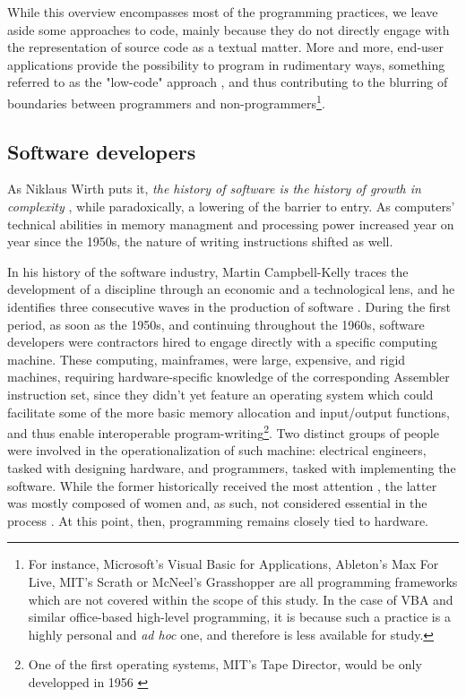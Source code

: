 While this overview encompasses most of the programming practices, we leave aside some approaches to code, mainly because they do not directly engage with the representation of source code as a textual matter. More and more, end-user applications provide the possibility to program in rudimentary ways, something referred to as the "low-code" approach \citep{team_lowcode_2021}, and thus contributing to the blurring of boundaries between programmers and non-programmers\footnote{For instance, Microsoft's Visual Basic for Applications, Ableton's Max For Live, MIT's Scrath or McNeel's Grasshopper are all programming frameworks which are not covered within the scope of this study. In the case of VBA and similar office-based high-level programming, it is because such a practice is a highly personal and \emph{ad hoc} one, and therefore is less available for study.}.

\subsection{Software developers}
\label{subsec:software-developers}

As Niklaus Wirth puts it, \emph{the history of software is the history of growth in complexity} \citep{wirth_brief_2008}, while paradoxically, a lowering of the barrier to entry. As computers' technical abilities in memory managment and processing power increased year on year since the 1950s, the nature of writing instructions shifted as well.

In his history of the software industry, Martin Campbell-Kelly traces the development of a discipline through an economic and a technological lens, and he identifies three consecutive waves in the production of software \citep{campbell-kelly_airline_2003}. During the first period, as soon as the 1950s, and continuing throughout the 1960s, software developers were contractors hired to engage directly with a specific computing machine. These computing, mainframes, were large, expensive, and rigid machines, requiring hardware-specific knowledge of the corresponding Assembler instruction set, since they didn't yet feature an operating system which could facilitate some of the more basic memory allocation and input/output functions, and thus enable interoperable program-writing\footnote{One of the first operating systems, MIT's Tape Director, would be only developped in 1956 \citep{ross_personal_1986}}. Two distinct groups of people were involved in the operationalization of such machine: electrical engineers, tasked with designing hardware, and programmers, tasked with implementing the software. While the former historically received the most attention \citep{ross_personal_1986}, the latter was mostly composed of women and, as such, not considered essential in the process \citep{light_when_1999}. At this point, then, programming remains closely tied to hardware.

